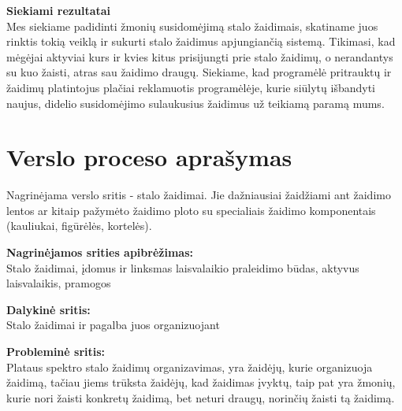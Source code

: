 \documentclass{VUMIFPSkursinis}
\begin{document}
\textbf{Siekiami rezultatai}\\
Mes siekiame padidinti žmonių susidomėjimą stalo žaidimais, skatiname juos rinktis tokią veiklą 
ir sukurti stalo žaidimus apjungiančią sistemą. Tikimasi, kad mėgėjai aktyviai kurs ir kvies 
kitus prisijungti prie stalo žaidimų, o nerandantys su kuo žaisti, atras sau žaidimo draugų. 
Siekiame, kad programėlė pritrauktų ir žaidimų platintojus plačiai reklamuotis programėlėje, 
kurie siūlytų išbandyti naujus, didelio susidomėjimo sulaukusius žaidimus už teikiamą paramą mums.

\section{Verslo proceso aprašymas}
Nagrinėjama verslo sritis - stalo žaidimai. Jie dažniausiai žaidžiami ant žaidimo 
lentos ar kitaip pažymėto žaidimo ploto su specialiais žaidimo komponentais 
(kauliukai, figūrėlės, kortelės).

\textbf{Nagrinėjamos srities apibrėžimas:}\\
Stalo žaidimai, įdomus ir linksmas laisvalaikio praleidimo būdas, aktyvus 
laisvalaikis, pramogos

\textbf{Dalykinė sritis:}\\
Stalo žaidimai ir pagalba juos organizuojant

\textbf{Probleminė sritis:}\\
Plataus spektro stalo žaidimų organizavimas, yra žaidėjų, kurie organizuoja 
žaidimą, tačiau jiems trūksta žaidėjų, kad žaidimas įvyktų, taip pat yra žmonių, 
kurie nori žaisti konkretų žaidimą, bet neturi draugų, norinčių žaisti tą žaidimą.
\end{document}

